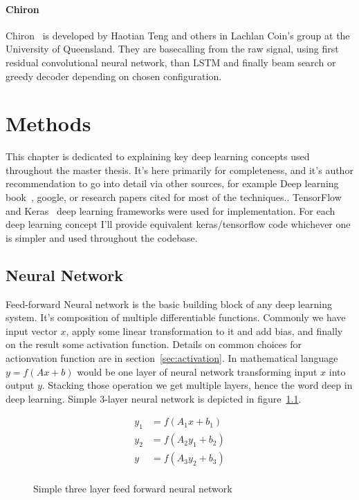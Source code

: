 \documentclass[times, utf8, diplomski, english]{fer}
\begin{document}
\subsubsection{Chiron}
Chiron~\citep{chiron_teng} is developed by Haotian Teng and others in Lachlan Coin's group at the University of Queensland. They are basecalling from the raw signal, using first residual convolutional neural network, than LSTM and finally beam search or greedy decoder depending on chosen configuration. 

\chapter{Methods}
\label{chap:methods}
This chapter is dedicated to explaining key deep learning concepts used throughout the master thesis. It's here primarily for completeness, and it's author recommendation to go into detail via other sources, for example Deep learning book~\citep{deep_learning_book-Goodfellow-et-al-2016}, google, or research papers cited for most of the techniques.. TensorFlow~\citep{tensorflow2015-whitepaper} and Keras~\citep{chollet2015keras} deep learning frameworks were used for implementation. For each deep learning concept I'll provide equivalent keras/tensorflow code whichever one is simpler and used throughout the codebase.

\section{Neural Network}
Feed-forward Neural network is the basic building block of any deep learning system. It's composition of multiple differentiable functions. Commonly we have input vector $x$, apply some linear transformation to it and add bias, and finally on the result some activation function. Details on common choices for actionvation function are in section~\ref{sec:activation}. In mathematical language $y = f(Ax + b)$ would be one layer of neural network transforming input $x$ into output $y$. Stacking those operation we get multiple layers, hence the word deep in deep learning. Simple 3-layer neural network is depicted in figure~\ref{fg:nn}.

\begin{figure}[!ht]
    \begin{center}
        \begin{align*}
            y_1 &= f(A_1x + b_1) \\
            y_2 &= f(A_2y_1 + b_2) \\
            y &= f(A_3y_2 + b_3) \\
        \end{align*}
        \caption{Simple three layer feed forward neural network}
        \label{fg:nn}
    \end{center}
\end{figure}
\end{document}
